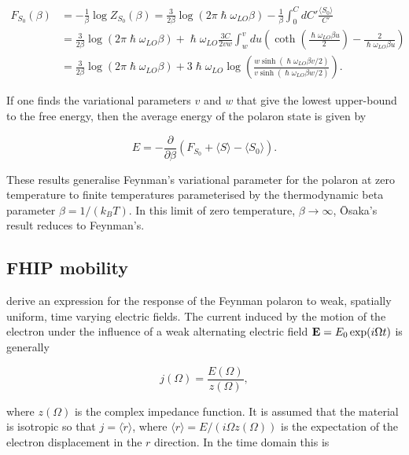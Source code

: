 \begin{equation}\label{eqn:osaka_trial_fenergy}
\begin{aligned}
    F_{S_0}(\beta) &= -\frac{1}{\beta} \log Z_{S_0}(\beta) = \frac{3}{2\beta} \log(2\pi\hslash\omega_{LO}\beta) - \frac{1}{\beta}\int^C_0 dC' \frac{\langle S_0 \rangle}{C'} \\
    &= \frac{3}{2\beta} \log(2\pi\hslash\omega_{LO}\beta) + \hslash\omega_{LO} \frac{3C}{2vw} \int_w^v du \left( \coth \left( \frac{\hslash\omega_{LO} \beta u}{2}\right) - \frac{2}{\hslash\omega_{LO}\beta u} \right) \\
    &= \frac{3}{2\beta} \log(2\pi\hslash\omega_{LO}\beta) + 3 \hslash \omega_{LO} \log \left( \frac{w \sinh \left( \hslash\omega_{LO} \beta v / 2 \right)}{v \sinh \left( \hslash\omega_{LO} \beta w / 2 \right)} \right).
\end{aligned}
\end{equation}

If one finds the variational parameters $v$ and $w$ that give the lowest upper-bound to the free energy, then the average energy of the polaron state is given by

\begin{equation}
    E = -\frac{\partial}{\partial \beta} \left( F_{S_0} + \langle S\rangle - \langle S_0 \rangle \right).
\end{equation}

These results generalise Feynman's variational parameter for the polaron at zero temperature to finite temperatures parameterised by the thermodynamic beta parameter $\beta = 1 / (k_B T)$. In this limit of zero temperature, $\beta \to \infty$, \=Osaka's result reduces to Feynman's.

\subsection{FHIP mobility}

\cite{feynman_mobility_1962} derive an expression for the response of the Feynman polaron to weak, spatially uniform, time varying electric fields. The current induced by the motion of the electron under the influence of a weak  alternating electric field $\vb{E} = E_0 \exp(i \Omega t)$ is generally

\begin{equation}
    j(\Omega) = \frac{E(\Omega)}{z(\Omega)} ,
\end{equation}

where $z(\Omega)$ is the complex impedance function. It is assumed that the material is isotropic so that $j = \langle \dot{r} \rangle$, where $\langle r \rangle = E / (i\Omega z(\Omega))$ is the expectation of the electron displacement in the $r$ direction. In the time domain this is

